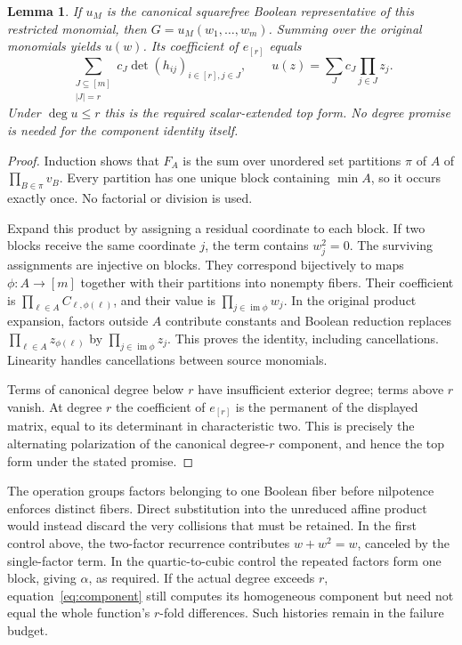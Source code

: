 \documentclass[11pt]{article}
\newtheorem{lemma}[theorem]{Lemma}
\theoremstyle{remark}\newtheorem{remark}[theorem]{Remark}
\begin{document}
\begin{lemma}\label{lem:partition}
If $u_M$ is the canonical squarefree Boolean representative of this restricted monomial, then $G=u_M(w_1,\ldots,w_m)$. Summing over the original monomials yields $u(w)$. Its coefficient of $e_{[r]}$ equals
\begin{equation}\label{eq:component}
 \sum_{\substack{J\subseteq[m]\\|J|=r}}c_J
       \det(h_{ij})_{i\in[r],j\in J},
 \qquad u(z)=\sum_J c_J\prod_{j\in J}z_j.
\end{equation}
Under $\deg u\le r$ this is the required scalar-extended top form. No degree promise is needed for the component identity itself.
\end{lemma}
\begin{proof}
Induction shows that $F_A$ is the sum over unordered set partitions $\pi$ of $A$ of $\prod_{B\in\pi}v_B$. Every partition has one unique block containing $\min A$, so it occurs exactly once. No factorial or division is used.

Expand this product by assigning a residual coordinate to each block. If two blocks receive the same coordinate $j$, the term contains $w_j^2=0$. The surviving assignments are injective on blocks. They correspond bijectively to maps $\phi:A\to[m]$ together with their partitions into nonempty fibers. Their coefficient is $\prod_{\ell\in A}C_{\ell,\phi(\ell)}$, and their value is $\prod_{j\in\operatorname{im}\phi}w_j$. In the original product expansion, factors outside $A$ contribute constants and Boolean reduction replaces $\prod_{\ell\in A}z_{\phi(\ell)}$ by $\prod_{j\in\operatorname{im}\phi}z_j$. This proves the identity, including cancellations. Linearity handles cancellations between source monomials.

Terms of canonical degree below $r$ have insufficient exterior degree; terms above $r$ vanish. At degree $r$ the coefficient of $e_{[r]}$ is the permanent of the displayed matrix, equal to its determinant in characteristic two. This is precisely the alternating polarization of the canonical degree-$r$ component, and hence the top form under the stated promise.
\end{proof}

The operation groups factors belonging to one Boolean fiber before nilpotence enforces distinct fibers. Direct substitution into the unreduced affine product would instead discard the very collisions that must be retained. In the first control above, the two-factor recurrence contributes $w+w^2=w$, canceled by the single-factor term. In the quartic-to-cubic control the repeated factors form one block, giving $\alpha$, as required. If the actual degree exceeds $r$, equation~\eqref{eq:component} still computes its homogeneous component but need not equal the whole function's $r$-fold differences. Such histories remain in the failure budget.
\end{document}
